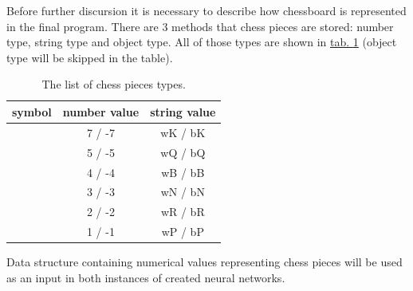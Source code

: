 Before further discursion it is necessary to describe how chessboard is represented in the final program. There are $3$ methods that chess pieces are stored: number type, string type and object type. All of those types are shown in \hyperref[tab:chess-pieces-types]{tab. \ref*{tab:chess-pieces-types}} (object type will be skipped in the table).
\begin{table}
	\centering
	\caption{The list of chess pieces types.}
	\label{tab:chess-pieces-types}
	\begin{tabular}{ccc}
	\toprule
		\textbf{symbol} & \textbf{number value} & \textbf{string value}\\
		\hline
			\WhiteKingOnWhite \BlackKingOnWhite & 7 / -7 & wK / bK\\
		\hline
			\WhiteQueenOnWhite \BlackQueenOnWhite & 5 / -5 & wQ / bQ\\
		\hline
			\WhiteBishopOnWhite \BlackBishopOnWhite & 4 / -4 & wB / bB\\
		\hline
			\WhiteKnightOnWhite \BlackKnightOnWhite & 3 / -3 & wN / bN\\
		\hline
			\WhiteRookOnWhite \BlackRookOnWhite & 2 / -2 & wR / bR\\
		\hline
			\WhitePawnOnWhite \BlackPawnOnWhite & 1 / -1 & wP / bP\\
	\end{tabular}
\end{table}
Data structure containing numerical values representing chess pieces will be used as an input in both instances of created neural networks.

